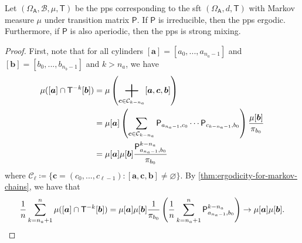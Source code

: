 \documentclass[a4paper]{article}
\begin{document}
\begin{corollary}\label{cor:ireeducible-iff-ergodicity}
	Let $(\Omega_{\mathsf{A}},\mathcal{B},\mu,\mathsf{T})$ be the \gls{pps} corresponding to
	the \gls{sft} $(\Omega_{\mathsf{A}},d,\mathsf{T})$
	with Markov measure $\mu$ under transition matrix $\mathsf{P}$.
	If $\mathsf{P}$ is irreducible, then the \gls{pps} ergodic.
	Furthermore, if $\mathsf{P}$ is also aperiodic, then the \gls{pps} is strong mixing.
\end{corollary}
\begin{proof}
	First, note that
	for all cylinders $[\boldsymbol{a}]=[a_0,...,a_{n_a-1}]$ and $[\boldsymbol{b}]=[b_{0},...,b_{n_b-1}]$ and $k>n_a$,
	we have
	\begin{align}
		\mu([\boldsymbol{a}]\cap\mathsf{T}\inv[k][\boldsymbol{b}])
		&= \mu \left(\bigplus_{\boldsymbol{c}\in\mathcal{C}_{k-n_a}}[\boldsymbol{a},\boldsymbol{c},\boldsymbol{b}]\right) \nonumber\\
		&= \mu[\boldsymbol{a}]
		\left(
		\sum_{\boldsymbol{c}\in\mathcal{C}_{k-n_a}} \mathsf{P}_{a_{n_a-1},c_0}\cdots\mathsf{P}_{c_{k-n_a-1},b_0}
		\right)
		\frac{ \mu[\boldsymbol{b}] }{ \pi_{b_0} } \nonumber\\
		&= \mu[\boldsymbol{a}] \mu[\boldsymbol{b}] \frac{ \mathsf{P}_{a_{n_a-1},b_0}^{k-n_a} }{ \pi_{b_0} }
		\label{eq:cylinders-rearrange}
	\end{align}
	where $\mathcal{C}_{\ell} \coloneqq \{\boldsymbol{c}=(c_0,...,c_{\ell-1}):[\boldsymbol{a},\boldsymbol{c},\boldsymbol{b}]\neq\varnothing\}$.
	By \autoref{thm:ergodicity-for-markov-chains}, we have that
	\begin{align*}
		\frac1n \sum_{k=n_a+1}^{n} \mu([\boldsymbol{a}]\cap\mathsf{T}\inv[k][\boldsymbol{b}])
		= \mu[\boldsymbol{a}] \mu[\boldsymbol{b}] \frac1{\pi_{b_0}} \left( \frac1n\sum_{k=n_a+1}^{n} \mathsf{P}_{a_{n_a-1},b_0}^{k-n_a} \right)
		\to \mu[\boldsymbol{a}] \mu[\boldsymbol{b}].
	\end{align*}


\end{proof}
\end{document}
